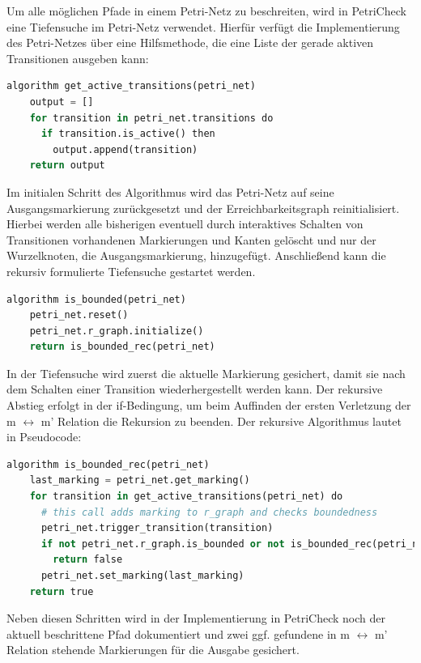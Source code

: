 Um alle möglichen Pfade in einem Petri-Netz zu beschreiten, wird in PetriCheck
eine Tiefensuche im Petri-Netz verwendet. Hierfür verfügt die Implementierung
des Petri-Netzes über eine Hilfsmethode, die eine Liste der gerade aktiven
Transitionen ausgeben kann:

\begin{lstlisting}[language=python, morekeywords={do, algorithm, then}]
  algorithm get_active_transitions(petri_net)
    output = []
    for transition in petri_net.transitions do
      if transition.is_active() then
        output.append(transition)
    return output
\end{lstlisting}

Im initialen Schritt des Algorithmus wird das Petri-Netz auf seine
Ausgangsmarkierung zurückgesetzt und der Erreichbarkeitsgraph reinitialisiert.
Hierbei werden alle bisherigen eventuell durch interaktives Schalten von
Transitionen vorhandenen Markierungen und Kanten gelöscht und nur der
Wurzelknoten, die Ausgangsmarkierung, hinzugefügt. Anschließend kann die rekursiv
formulierte Tiefensuche gestartet werden.

\begin{lstlisting}[language=python, morekeywords={do, algorithm, then}]
  algorithm is_bounded(petri_net)
    petri_net.reset()
    petri_net.r_graph.initialize()
    return is_bounded_rec(petri_net)
\end{lstlisting}

In der Tiefensuche wird zuerst die aktuelle Markierung gesichert, damit sie nach
dem Schalten einer Transition wiederhergestellt werden kann. Der rekursive
Abstieg erfolgt in der if-Bedingung, um beim Auffinden der ersten Verletzung der
m $\leftrightarrow$ m' Relation die Rekursion zu beenden. Der rekursive
Algorithmus lautet in Pseudocode:

\begin{lstlisting}[language=python, morekeywords={do, algorithm, then}]
  algorithm is_bounded_rec(petri_net)
    last_marking = petri_net.get_marking()
    for transition in get_active_transitions(petri_net) do
      # this call adds marking to r_graph and checks boundedness
      petri_net.trigger_transition(transition)
      if not petri_net.r_graph.is_bounded or not is_bounded_rec(petri_net) then
        return false
      petri_net.set_marking(last_marking)
    return true
\end{lstlisting}

Neben diesen Schritten wird in der Implementierung in PetriCheck noch der
aktuell beschrittene Pfad dokumentiert und zwei ggf. gefundene in m
$\leftrightarrow$ m' Relation stehende Markierungen für die Ausgabe gesichert.

